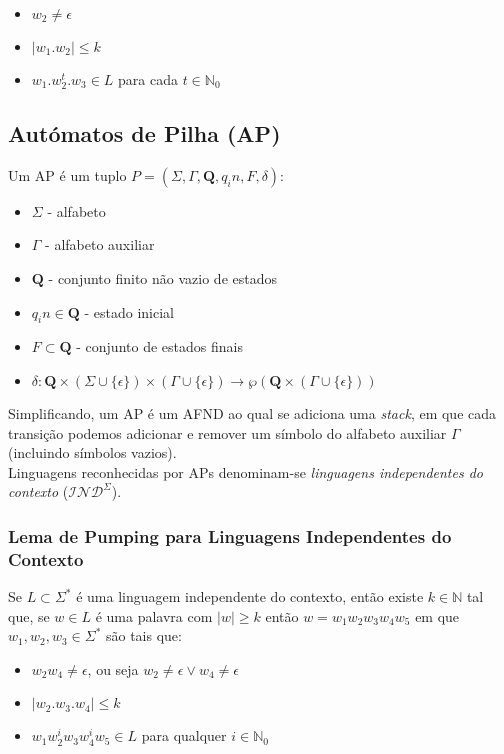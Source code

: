 \documentclass{article}
\begin{document}
\begin{itemize}
    \item $w_2 \neq \epsilon$
    \item $|w_1.w_2| \leq k$
    \item $w_1.w_2^t.w_3 \in L$ para cada $t \in \mathbb{N}_0$
\end{itemize}

\subsection{Autómatos de Pilha (AP)}

Um AP é um tuplo $P = (\Sigma, \Gamma, \mathbf{Q}, q_in, F, \delta)$:

\begin{itemize}
    \item $\Sigma$ - alfabeto
    \item $\Gamma$ - alfabeto auxiliar
    \item $\mathbf{Q}$ - conjunto finito não vazio de estados
    \item $q_in \in \mathbf{Q}$ - estado inicial
    \item $F \subset \mathbf{Q}$ - conjunto de estados finais
    \item $\delta : \mathbf{Q} \times (\Sigma \cup \{\epsilon\}) \times (\Gamma \cup \{\epsilon\}) \to \wp(\mathbf{Q} \times (\Gamma \cup \{\epsilon\}))$
\end{itemize}

\noindent Simplificando, um AP é um AFND ao qual se adiciona uma \emph{stack}, em que cada transição podemos adicionar e remover um símbolo do alfabeto auxiliar $\Gamma$ (incluindo símbolos vazios). \\
Linguagens reconhecidas por APs denominam-se \emph{linguagens independentes do contexto} ($\mathcal{IND}^\Sigma$).

\subsubsection{Lema de Pumping para Linguagens Independentes do Contexto}

Se $L \subset \Sigma^*$ é uma linguagem independente do contexto, então existe $k \in \mathbb{N}$ tal que, se $w \in L$ é uma palavra com $|w| \geq k$ então $w = w_1w_2w_3w_4w_5$ em que $w_1,w_2,w_3 \in \Sigma^*$ são tais que:

\begin{itemize}
    \item $w_2w_4 \neq \epsilon$, ou seja $w_2 \neq \epsilon \vee w_4 \neq \epsilon$
    \item $|w_2.w_3.w_4| \leq k$
    \item $w_1w_2^iw_3w_4^iw_5 \in L$ para qualquer $i \in \mathbb{N}_0$
\end{itemize}
\end{document}
